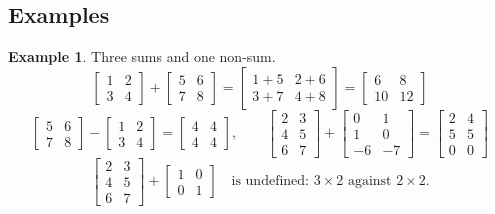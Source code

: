 \documentclass[11pt]{article}
\theoremstyle{plain}
\theoremstyle{definition}
\newtheorem{ex}{Example}[section]
\theoremstyle{remark}
\begin{document}
\subsection{Examples}
\begin{ex}
Three sums and one non-sum.
\[
  \begin{bmatrix}1&2\\3&4\end{bmatrix}
  +\begin{bmatrix}5&6\\7&8\end{bmatrix}
  =\begin{bmatrix}1{+}5&2{+}6\\3{+}7&4{+}8\end{bmatrix}
  =\begin{bmatrix}6&8\\10&12\end{bmatrix}
\]
\[
  \begin{bmatrix}5&6\\7&8\end{bmatrix}
  -\begin{bmatrix}1&2\\3&4\end{bmatrix}
  =\begin{bmatrix}4&4\\4&4\end{bmatrix},
  \qquad
  \begin{bmatrix}2&3\\4&5\\6&7\end{bmatrix}
  +\begin{bmatrix}0&1\\1&0\\-6&-7\end{bmatrix}
  =\begin{bmatrix}2&4\\5&5\\0&0\end{bmatrix}
\]
\[
  \begin{bmatrix}2&3\\4&5\\6&7\end{bmatrix}
  +\begin{bmatrix}1&0\\0&1\end{bmatrix}
  \quad\text{is undefined: } 3\times2 \text{ against } 2\times2 .
\]
\end{ex}
\end{document}
